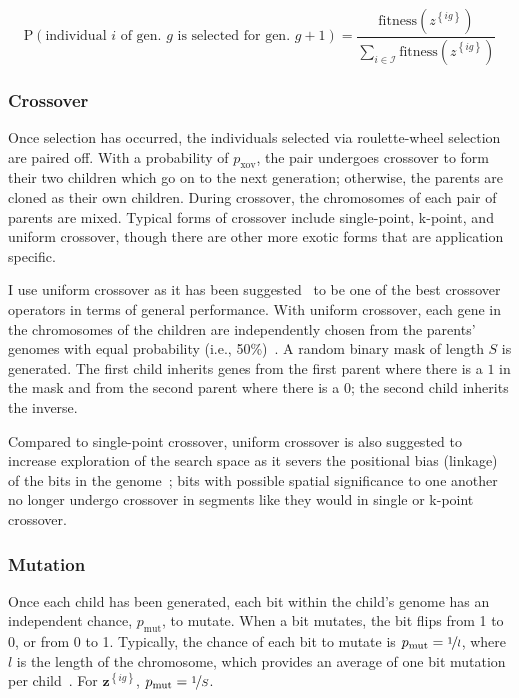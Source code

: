 \documentclass[12pt,dvipsnames]{report}
\begin{document}
\begin{equation}
\text{P}\left( \text{individual $i$ of gen. $g$ is selected for gen. $g+1$} \right) = \frac{\text{fitness}\left( z^{\left\{ ig \right\}} \right)}{\sum_{i \in \mathcal{I}} \text{fitness}\left( z^{\left\{ ig \right\}} \right)}
\end{equation}

\subsubsection{Crossover}

Once selection has occurred, the individuals selected via roulette-wheel selection are paired off.  With a probability of $p_{\text{xov}}$, the pair undergoes crossover to form their two children which go on to the next generation; otherwise, the parents are cloned as their own children.  During crossover, the chromosomes of each pair of parents are mixed.  Typical forms of crossover include single-point, k-point, and uniform crossover, though there are other more exotic forms that are application specific.

I use uniform crossover as it has been suggested~\cite{Picek:2011:ECO:2184629.2184665} to be one of the best crossover operators in terms of general performance.  With uniform crossover, each gene in the chromosomes of the children are independently chosen from the parents' genomes with equal probability (i.e., 50\%)~\cite{Syswerda:1989:UCG:645512.657265}.  A random binary mask of length $S$ is generated.  The first child inherits genes from the first parent where there is a $1$ in the mask and from the second parent where there is a $0$; the second child inherits the inverse.

Compared to single-point crossover, uniform crossover is also suggested to increase exploration of the search space as it severs the positional bias (linkage) of the bits in the genome~\cite{782011}; bits with possible spatial significance to one another no longer undergo crossover in segments like they would in single or k-point crossover.

\subsubsection{Mutation}

Once each child has been generated, each bit within the child's genome has an independent chance, $p_{\text{mut}}$, to mutate.  When a bit mutates, the bit flips from 1 to 0, or from 0 to 1.  Typically, the chance of each bit to mutate is $p_{\text{mut}} = \nicefrac{1}{l}$, where $l$ is the length of the chromosome, which provides an average of one bit mutation per child~\cite{GREENWELL19951,Deb2011}.  For $\textbf{z}^{\left\{ ig \right\}}$, $p_{\text{mut}} = \nicefrac{1}{S}$.
\end{document}
